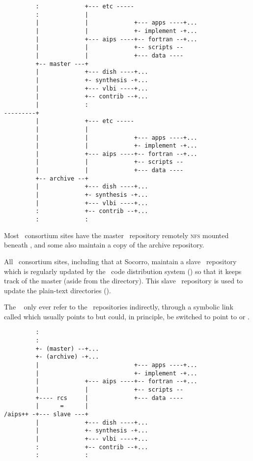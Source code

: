 \begin{verbatim}
         :             +--- etc -----
         :             |
         |             |             +--- apps ----+...
         |             |             +- implement -+...
         |             +--- aips ----+-- fortran --+...
         |             |             +-- scripts --
         |             |             +--- data ----
         +-- master ---+
         |             +--- dish ----+...
         |             +- synthesis -+...
         |             +--- vlbi ----+...
         |             +-- contrib --+...
         |             :
---------+
         |             +--- etc -----
         |             |
         |             |             +--- apps ----+...
         |             |             +- implement -+...
         |             +--- aips ----+-- fortran --+...
         |             |             +-- scripts --
         |             |             +--- data ----
         +-- archive --+
         |             +--- dish ----+...
         |             +- synthesis -+...
         |             +--- vlbi ----+...
         :             +-- contrib --+...
         :             :
\end{verbatim}

Most \aipspp\ consortium sites have the master \rcs\ repository remotely
\textsc{nfs} mounted beneath , and some also maintain a copy
of the archive repository.

All \aipspp\ consortium sites, including that at Socorro, maintain a slave
\rcs\ repository which is regularly updated by the \aipspp\ code distribution
system () so that it keeps track of the master (aside
from the  directory).  This slave \rcs\ repository is used to
update the plain-text  directories ().

The \aipspp\  only ever refer to the \rcs\ repositories
indirectly, through a symbolic link called  which usually points to
 but could, in principle, be switched to point to  or
.

\begin{verbatim}
         :
         :
         +- (master) --+...
         +- (archive) -+...
         |                           +--- apps ----+...
         |                           +- implement -+...
         |             +--- aips ----+-- fortran --+...
         |             |             +-- scripts --
         +---- rcs     |             +--- data ----
         |      =      |
/aips++ -+--- slave ---+
         |             +--- dish ----+...
         |             +- synthesis -+...
         |             +--- vlbi ----+...
         :             +-- contrib --+...
         :             :
\end{verbatim}

